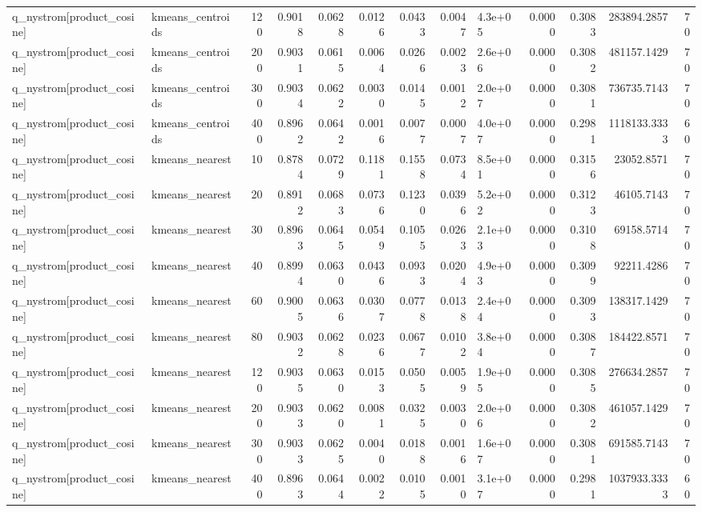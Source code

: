 \begin{table}
\begin{tabular}{llrrrrrrlrrrr}
q\_nystrom[product\_cosine] & kmeans\_centroids & 120 & 0.9018 & 0.0628 & 0.0126 & 0.0433 & 0.0047 & 4.3e+05 & 0.0000 & 0.3083 & 283894.2857 & 70 \\
q\_nystrom[product\_cosine] & kmeans\_centroids & 200 & 0.9031 & 0.0615 & 0.0064 & 0.0266 & 0.0023 & 2.6e+06 & 0.0000 & 0.3082 & 481157.1429 & 70 \\
q\_nystrom[product\_cosine] & kmeans\_centroids & 300 & 0.9034 & 0.0622 & 0.0030 & 0.0145 & 0.0012 & 2.0e+07 & 0.0000 & 0.3081 & 736735.7143 & 70 \\
q\_nystrom[product\_cosine] & kmeans\_centroids & 400 & 0.8962 & 0.0642 & 0.0016 & 0.0077 & 0.0007 & 4.0e+07 & 0.0000 & 0.2981 & 1118133.3333 & 60 \\
q\_nystrom[product\_cosine] & kmeans\_nearest & 10 & 0.8784 & 0.0729 & 0.1181 & 0.1558 & 0.0734 & 8.5e+01 & 0.0000 & 0.3156 & 23052.8571 & 70 \\
q\_nystrom[product\_cosine] & kmeans\_nearest & 20 & 0.8912 & 0.0683 & 0.0736 & 0.1230 & 0.0396 & 5.2e+02 & 0.0000 & 0.3123 & 46105.7143 & 70 \\
q\_nystrom[product\_cosine] & kmeans\_nearest & 30 & 0.8963 & 0.0645 & 0.0549 & 0.1055 & 0.0263 & 2.1e+03 & 0.0000 & 0.3108 & 69158.5714 & 70 \\
q\_nystrom[product\_cosine] & kmeans\_nearest & 40 & 0.8994 & 0.0630 & 0.0436 & 0.0933 & 0.0204 & 4.9e+03 & 0.0000 & 0.3099 & 92211.4286 & 70 \\
q\_nystrom[product\_cosine] & kmeans\_nearest & 60 & 0.9005 & 0.0636 & 0.0307 & 0.0778 & 0.0138 & 2.4e+04 & 0.0000 & 0.3093 & 138317.1429 & 70 \\
q\_nystrom[product\_cosine] & kmeans\_nearest & 80 & 0.9032 & 0.0628 & 0.0236 & 0.0677 & 0.0102 & 3.8e+04 & 0.0000 & 0.3087 & 184422.8571 & 70 \\
q\_nystrom[product\_cosine] & kmeans\_nearest & 120 & 0.9035 & 0.0630 & 0.0153 & 0.0505 & 0.0059 & 1.9e+05 & 0.0000 & 0.3085 & 276634.2857 & 70 \\
q\_nystrom[product\_cosine] & kmeans\_nearest & 200 & 0.9033 & 0.0620 & 0.0081 & 0.0325 & 0.0030 & 2.0e+06 & 0.0000 & 0.3082 & 461057.1429 & 70 \\
q\_nystrom[product\_cosine] & kmeans\_nearest & 300 & 0.9033 & 0.0625 & 0.0040 & 0.0188 & 0.0016 & 1.6e+07 & 0.0000 & 0.3081 & 691585.7143 & 70 \\
q\_nystrom[product\_cosine] & kmeans\_nearest & 400 & 0.8963 & 0.0644 & 0.0022 & 0.0105 & 0.0010 & 3.1e+07 & 0.0000 & 0.2981 & 1037933.3333 & 60 \\

\end{tabular}
\end{table}
